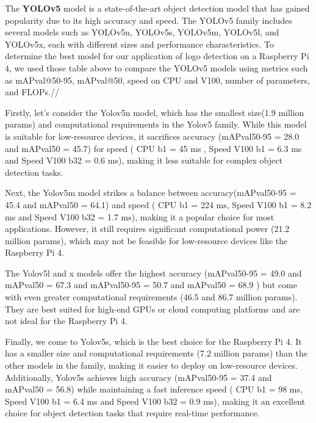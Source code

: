 \begin{itemize}

\FloatBarrier

The \textbf{YOLOv5} model is a state-of-the-art object detection model that has gained popularity due to its high accuracy and speed. The YOLOv5 family includes several models such as YOLOv5n, YOLOv5s, YOLOv5m, YOLOv5l, and YOLOv5x, each with different sizes and performance characteristics. To determine the best model for our application of logo detection on a Raspberry Pi 4, we used those table above to compare the YOLOv5 models using metrics such as mAPval@50-95, mAPval@50, speed on CPU and V100, number of parameters, and FLOPs.//

Firstly, let's consider the Yolov5n model, which has the smallest size(1.9 million params) and computational requirements in the Yolov5 family. While this model is suitable for low-resource devices, it sacrifices accuracy (mAPval50-95 = 28.0 and mAPval50 =  45.7) for speed ( CPU b1 = 45 ms  , Speed V100 b1 = 6.3 ms and Speed V100 b32 = 	0.6 ms), making it less suitable for complex object detection tasks.

Next, the Yolov5m model strikes a balance between accuracy(mAPval50-95 = 45.4 and mAPval50 =  64.1) and speed ( CPU b1 = 224 ms, Speed V100 b1 = 8.2 ms and Speed V100 b32 = 1.7 ms), making it a popular choice for most applications. However, it still requires significant computational power (21.2 million params), which may not be feasible for low-resource devices like the Raspberry Pi 4.

The Yolov5l and x models offer the highest accuracy (mAPval50-95 = 49.0 and mAPval50 =  67.3 and mAPval50-95 = 50.7 and mAPval50 =  68.9 ) but come with even greater computational requirements (46.5 and 86.7 million params). They are best suited for high-end GPUs or cloud computing platforms and are not ideal for the Raspberry Pi 4.

Finally, we come to Yolov5s, which is the best choice for the Raspberry Pi 4. It has a smaller size and computational requirements (7.2 million params) than the other models in the family, making it easier to deploy on low-resource devices. Additionally, Yolov5s achieves high accuracy (mAPval50-95 = 37.4 and mAPval50 =  56.8) while maintaining a fast inference speed ( CPU b1 = 98 ms, Speed V100 b1 = 6.4 ms and Speed V100 b32 = 0.9 ms), making it an excellent choice for object detection tasks that require real-time performance.


\end{itemize}
